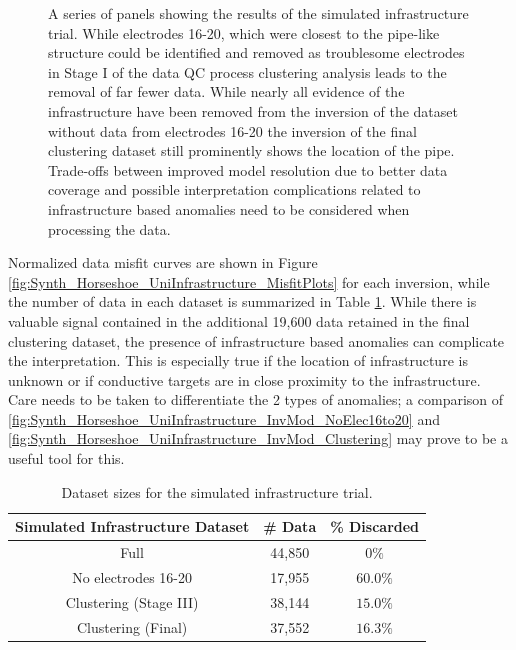 \documentclass[final,authoryear,5p,times,twocolumn]{elsarticle}
\begin{document}
\begin{figure} [!ht]
\begin{center}
{       } %
    \end{center}
\caption{A series of panels showing the results of the simulated infrastructure trial. While electrodes 16-20, which were closest to the pipe-like structure could be identified and removed as troublesome electrodes in Stage I of the data QC process clustering analysis leads to the removal of far fewer data. While nearly all evidence of the infrastructure have been removed from the inversion of the dataset without data from electrodes 16-20 the inversion of the final clustering dataset still prominently shows the location of the pipe. Trade-offs between improved model resolution due to better data coverage and possible interpretation complications related to infrastructure based anomalies need to be considered when processing the data.}
\label{fig:Synth_Horseshoe_UniInfrastructure}
\end{figure}

Normalized data misfit curves are shown in Figure \ref{fig:Synth_Horseshoe_UniInfrastructure_MisfitPlots} for each inversion, while the number of data in each dataset is summarized in Table \ref{tab:Synth_Infrastructure_Sizes}. While there is valuable signal contained in the additional 19,600 data retained in the final clustering dataset, the presence of infrastructure based anomalies can complicate the interpretation. This is especially true if the location of infrastructure is unknown or if conductive targets are in close proximity to the infrastructure. Care needs to be taken to differentiate the 2 types of anomalies; a comparison of \ref{fig:Synth_Horseshoe_UniInfrastructure_InvMod_NoElec16to20} and \ref{fig:Synth_Horseshoe_UniInfrastructure_InvMod_Clustering} may prove to be a useful tool for this.

\begin{table}[!ht]
\small
\begin{center}
  \begin{tabular}{| c | c | c |}
    \hline
    \bf{Simulated Infrastructure Dataset} & \bf{\# Data} & \bf{\% Discarded} \\
    \hline
    Full &  44,850 & $0 \%$ \\
    \hline
    No electrodes 16-20 & 17,955 & $60.0 \%$ \\
    \hline
    Clustering (Stage III) & 38,144 & $15.0 \%$ \\
    \hline
    Clustering (Final) & 37,552 & $16.3 \%$ \\
    \hline
  \end{tabular}
\caption{Dataset sizes for the simulated infrastructure trial.}
\label{tab:Synth_Infrastructure_Sizes}
\end{center}
\end{table}
\end{document}
